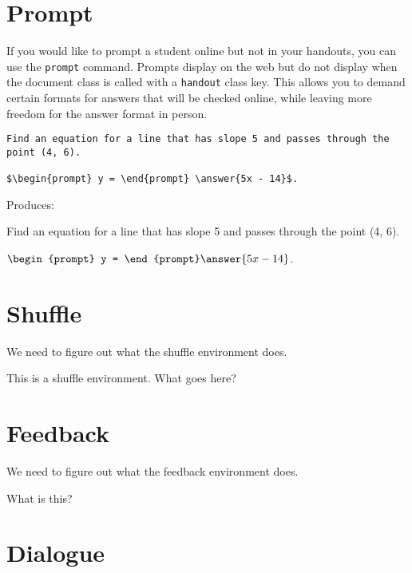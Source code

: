 \documentclass{ximera}
\begin{document}
\section{Prompt} \label{Prompts}

\begin{example} If you would like to prompt a student online but not in your handouts, you can use the \verb!prompt! command. Prompts display on the web but do not display when the document class is called with a \verb!handout! class key. This allows you to demand certain formats for answers that will be checked online, while leaving more freedom for the answer format in person.

\begin{verbatim}
Find an equation for a line that has slope 5 and passes through the point (4, 6). 

$\begin{prompt} y = \end{prompt} \answer{5x - 14}$.
\end{verbatim}

Produces:

Find an equation for a line that has slope 5 and passes through the point (4, 6). 

$\begin{prompt} y = \end{prompt} \answer{5x - 14}$.

\end{example}

\section{Shuffle}

We need to figure out what the shuffle environment does.

\begin{shuffle}
This is a shuffle environment. What goes here?
\end{shuffle}


\section{Feedback}

We need to figure out what the feedback environment does.

\begin{feedback}
What is this?
\end{feedback}

\section{Dialogue}
\end{document}
